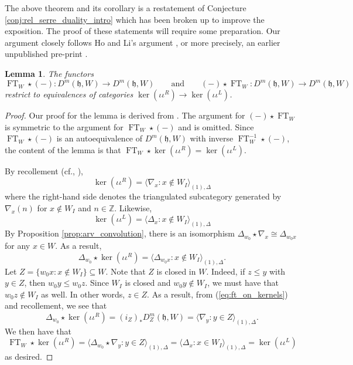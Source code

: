 \documentclass{amsart}
\newcommand{\Z}{\mathbb{Z}}
\newcommand{\BE}{D^m}
\newcommand{\fr}[1]{\mathfrak{#1}}
\newtheorem{lemma}{Lemma}[section]
\theoremstyle{definition}
\DeclareMathOperator{\FT}{FT}
\begin{document}
        The above theorem and its corollary is a restatement of Conjecture \ref{conj:rel_serre_duality_intro} which has been broken up to improve the exposition.
        The proof of these statements will require some preparation.
        Our argument closely follows Ho and Li's argument \cite{HLnew}, or more precisely, an earlier unpublished pre-print \cite{HLold}.

        \begin{lemma}\label{lem:ft_on_kernels}
                The functors 
                \[ \FT_W \star (-): \BE (\fr{h}, W) \to \BE (\fr{h}, W) \qquad\text{and}\qquad (-) \star \FT_W: \BE (\fr{h}, W) \to \BE (\fr{h}, W)\] 
                restrict to equivalences of categories $\ker (\iota \iota^R) \to \ker (\iota \iota^L)$.
        \end{lemma}
        \begin{proof}
                Our proof for the lemma is derived from \cite[Lemma 3.3.2]{HLnew}.
                The argument for $(-) \star \FT_W$ is symmetric to the argument for $\FT_W \star (-)$ and is omitted.
                Since $\FT_W \star (-)$ is an autoequivalence of $\BE (\fr{h}, W)$ with inverse $\FT_W^{-1} \star (-)$, the content of the lemma is that $\FT_W \star \ker (\iota \iota^R) = \ker (\iota \iota^L)$.
                
                By recollement (cf., \cite[Lemma 6.9]{ARV}), 
                \[\ker (\iota \iota^R) = \langle \nabla_x : x \notin W_I\rangle_{(1), \Delta}\]
                where the right-hand side denotes the triangulated subcategory generated by $\nabla_x (n)$ for $x \notin W_I$ and $n \in \Z$.
                Likewise, 
                \[\ker (\iota \iota^L) = \langle \Delta_x : x \notin W_I\rangle_{(1), \Delta}\]
                By Proposition \ref{prop:arv_convolution}, there is an isomorphism $\Delta_{w_0} \star \nabla_x \cong \Delta_{w_0 x}$ for any $x \in W$.
                As a result,
                \begin{equation}\label{eq:ft_on_kernels}
                        \Delta_{w_0} \star \ker (\iota \iota^R) = \langle \Delta_{w_0 x} : x \notin W_I\rangle_{(1), \Delta}.
                \end{equation}
                Let $Z = \{ w_0 x : x \notin W_I \} \subseteq W$. Note that $Z$ is closed in $W$. Indeed, if $z \leq y$ with $y \in Z$, then $w_0 y \leq w_0 z$.
                Since $W_I$ is closed and $w_0 y \notin W_I$, we must have that $w_0 z \notin W_I$ as well. In other words, $z \in Z$.
                As a result, from (\ref{eq:ft_on_kernels}) and recollement, we see that
                \[ \Delta_{w_0} \star \ker (\iota \iota^R) = (i_Z)_* \BE_{Z} (\fr{h}, W) = \langle \nabla_y : y \in Z \rangle_{(1), \Delta}.\]
                We then have that
                \[\FT_{W} \star \ker (\iota \iota^R) = \langle \Delta_{w_0} \star \nabla_y : y \in Z \rangle_{(1), \Delta} = \langle \Delta_x : x \in W_I\rangle_{(1), \Delta} = \ker (\iota \iota^L)\]
                as desired.
        \end{proof}
\end{document}
